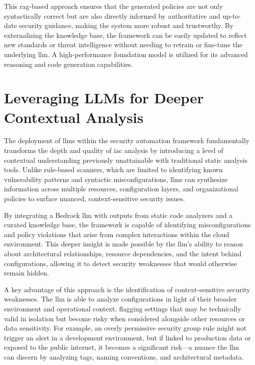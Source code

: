 This \gls{rag}-based approach ensures that the generated policies are not only syntactically correct but are also directly informed by authoritative and up-to-date security guidance, making the system more robust and trustworthy. By externalizing the knowledge base, the framework can be easily updated to reflect new standards or threat intelligence without needing to retrain or fine-tune the underlying \gls{llm}. A high-performance foundation model is utilized for its advanced reasoning and code generation capabilities.


\section{Leveraging LLMs for Deeper Contextual Analysis} %
\label{sec:Leveraging LLMs for Deeper Contextual Analysis}

The deployment of \glspl{llm} within the security automation framework fundamentally transforms the depth and quality of \gls{iac} analysis by introducing a level of contextual understanding previously unattainable with traditional static analysis tools\cite{li_iris_2025, andrade_enhancing_2025-1}. Unlike rule-based scanners, which are limited to identifying known vulnerability patterns and syntactic misconfigurations, \glspl{llm} can synthesize information across multiple resources, configuration layers, and organizational policies to surface nuanced, context-sensitive security issues\cite{li_iris_2025}.

By integrating a Bedrock \gls{llm} with outputs from static code analyzers and a curated knowledge base, the framework is capable of identifying misconfigurations and policy violations that arise from complex interactions within the cloud environment\cite{andrade_enhancing_2025-1}. This deeper insight is made possible by the \gls{llm}'s ability to reason about architectural relationships, resource dependencies, and the intent behind configurations, allowing it to detect security weaknesses that would otherwise remain hidden\cite{li_iris_2025, andrade_enhancing_2025-1}.

A key advantage of this approach is the identification of context-sensitive security weaknesses. The \gls{llm} is able to analyze configurations in light of their broader environment and operational context, flagging settings that may be technically valid in isolation but become risky when considered alongside other resources or data sensitivity. For example, an overly permissive security group rule might not trigger an alert in a development environment, but if linked to production data or exposed to the public internet, it becomes a significant risk—a nuance the \gls{llm} can discern by analyzing tags, naming conventions, and architectural metadata\cite{andrade_enhancing_2025-1}.

